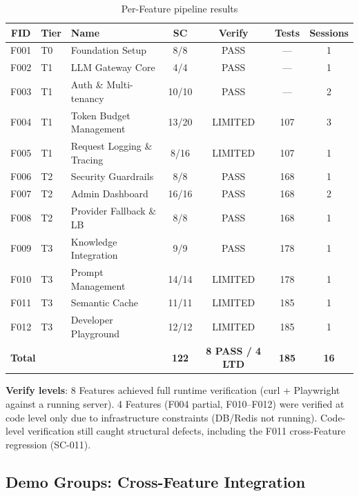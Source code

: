 \documentclass[11pt,a4paper,openright,twoside]{report}
\begin{document}
\begin{table}[H]
\centering
\caption{Per-Feature pipeline results}
\label{tab:aegis-features}
\small
\begin{tabularx}{\textwidth}{clXcccc}
\toprule
\textbf{FID} & \textbf{Tier} & \textbf{Name} & \textbf{SC} & \textbf{Verify} & \textbf{Tests} & \textbf{Sessions} \\
\midrule
F001 & T0 & Foundation Setup & 8/8 & \textcolor{specgreen}{PASS} & --- & 1 \\
F002 & T1 & LLM Gateway Core & 4/4 & \textcolor{specgreen}{PASS} & --- & 1 \\
F003 & T1 & Auth \& Multi-tenancy & 10/10 & \textcolor{specgreen}{PASS} & --- & 2 \\
F004 & T1 & Token Budget Management & 13/20 & \textcolor{specorange}{LIMITED} & 107 & 3 \\
F005 & T1 & Request Logging \& Tracing & 8/16 & \textcolor{specorange}{LIMITED} & 107 & 1 \\
F006 & T2 & Security Guardrails & 8/8 & \textcolor{specgreen}{PASS} & 168 & 1 \\
F007 & T2 & Admin Dashboard & 16/16 & \textcolor{specgreen}{PASS} & 168 & 2 \\
F008 & T2 & Provider Fallback \& LB & 8/8 & \textcolor{specgreen}{PASS} & 168 & 1 \\
F009 & T3 & Knowledge Integration & 9/9 & \textcolor{specgreen}{PASS} & 178 & 1 \\
F010 & T3 & Prompt Management & 14/14 & \textcolor{specorange}{LIMITED} & 178 & 1 \\
F011 & T3 & Semantic Cache & 11/11 & \textcolor{specorange}{LIMITED} & 185 & 1 \\
F012 & T3 & Developer Playground & 12/12 & \textcolor{specorange}{LIMITED} & 185 & 1 \\
\midrule
\multicolumn{3}{l}{\textbf{Total}} & \textbf{122} & \textbf{8 PASS / 4 LTD} & \textbf{185} & \textbf{16} \\
\bottomrule
\end{tabularx}
\end{table}

\textbf{Verify levels}: 8 Features achieved full runtime verification (curl + Playwright against a running server). 4 Features (F004 partial, F010--F012) were verified at code level only due to infrastructure constraints (DB/Redis not running). Code-level verification still caught structural defects, including the F011 cross-Feature regression (SC-011).

\subsection{Demo Groups: Cross-Feature Integration}
\end{document}
